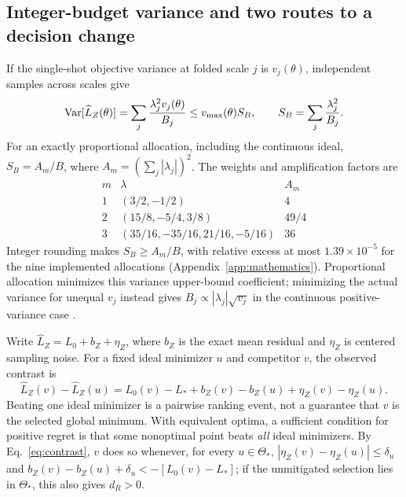 \subsection{Integer-budget variance and two routes to a decision change}\label{sec:routes}
If the single-shot objective variance at folded scale $j$ is $v_j(\theta)$, independent samples across scales give
\begin{equation}
 \mathrm{Var}[\widehat L_Z(\theta)]=\sum_j\frac{\lambda_j^2v_j(\theta)}{B_j}
 \le v_{\max}(\theta)S_B,\qquad S_B=\sum_j\frac{\lambda_j^2}{B_j}.\label{eq:integer_variance}
\end{equation}
For an exactly proportional allocation, including the continuous ideal, $S_B=A_m/B$, where $A_m=(\sum_j|\lambda_j|)^2$. The weights and amplification factors are
\begin{equation}
\begin{array}{c|c|c}
m&\lambda&A_m\\\hline
1&(3/2,-1/2)&4\\
2&(15/8,-5/4,3/8)&49/4\\
3&(35/16,-35/16,21/16,-5/16)&36
\end{array}
\end{equation}
Integer rounding makes $S_B\ge A_m/B$, with relative excess at most $1.39\times10^{-5}$ for the nine implemented allocations (Appendix~\ref{app:mathematics}). Proportional allocation minimizes this variance upper-bound coefficient; minimizing the actual variance for unequal $v_j$ instead gives $B_j\propto|\lambda_j|\sqrt{v_j}$ in the continuous positive-variance case \citep{Krebsbach2022RichardsonOptimization}.

Write $\widehat L_Z=L_0+b_Z+\eta_Z$, where $b_Z$ is the exact mean residual and $\eta_Z$ is centered sampling noise. For a fixed ideal minimizer $u$ and competitor $v$, the observed contrast is
\begin{equation}
 \widehat L_Z(v)-\widehat L_Z(u)=L_0(v)-L_*+b_Z(v)-b_Z(u)+\eta_Z(v)-\eta_Z(u).\label{eq:contrast}
\end{equation}
Beating one ideal minimizer is a pairwise ranking event, not a guarantee that $v$ is the selected global minimum. With equivalent optima, a sufficient condition for positive regret is that some nonoptimal point beats \emph{all} ideal minimizers. By Eq.~\eqref{eq:contrast}, $v$ does so whenever, for every $u\in\Theta_*$, $|\eta_Z(v)-\eta_Z(u)|\le\delta_u$ and $b_Z(v)-b_Z(u)+\delta_u<-[L_0(v)-L_*]$; if the unmitigated selection lies in $\Theta_*$, this also gives $d_R>0$.

